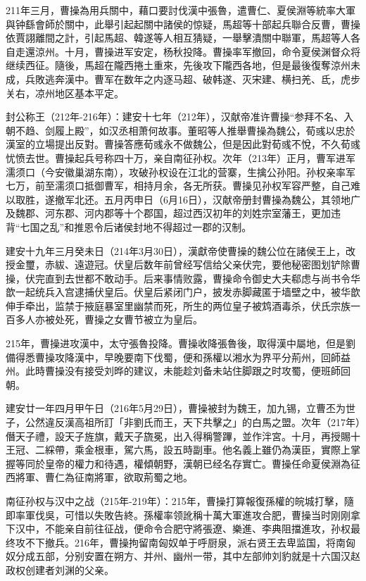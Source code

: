 211年三月，曹操為用兵關中，藉口要討伐漢中張魯，遣曹仁、夏侯淵等統率大軍與钟繇會師於關中，此舉引起起關中諸侯的惊疑，馬超等十部起兵聯合反曹，曹操依賈詡離間之計，引起馬超、韓遂等人相互猜疑，一舉擊潰關中聯軍，馬超等人各自走還涼州。十月，曹操进军安定，杨秋投降。曹操率军撤回，命令夏侯渊督众将继续西征。隨後，馬超在隴西捲土重來，先後攻下隴西各地，但是最後復奪涼州未成，兵敗逃奔漢中。曹军在数年之内逐马超、破韩遂、灭宋建、横扫羌、氐，虎步关右，凉州地区基本平定。

封公称王（212年-216年）：建安十七年（212年），汉献帝准许曹操“参拜不名、入朝不趋、剑履上殿”，如汉丞相萧何故事。董昭等人推舉曹操為魏公，荀彧以忠於漢室的立場提出反對。曹操答應荀彧永不做魏公，但是因此對荀彧不悅，不久荀彧忧愤去世。曹操起兵号称四十万，亲自南征孙权。次年（213年）正月，曹军进军濡须口（今安徽巢湖东南），攻破孙权设在江北的营寨，生擒公孙阳。孙权亲率军七万，前至濡须口抵御曹军，相持月余，各无所获。曹操见孙权军容严整，自己难以取胜，遂撤军北还。五月丙申日（6月16日），汉献帝册封曹操為魏公，其领地广及魏郡、河东郡、河内郡等十个郡国，超过西汉初年的刘姓宗室藩王，更加违背“七国之乱”和推恩令后诸侯封地不得超过一郡的汉制。

建安十九年三月癸未日（214年3月30日），漢獻帝使曹操的魏公位在諸侯王上，改授金璽，赤紱、遠遊冠。伏皇后数年前曾经写信给父亲伏完，要他秘密图划铲除曹操，伏完直到去世都不敢动手。后来事情败露，曹操命令御史大夫郗虑与尚书令华歆一起统兵入宫逮捕伏皇后。伏皇后紧闭门户，披发赤脚藏匿于墙壁之中，被华歆伸手牵出，监禁于掖庭暴室里幽禁而死，所生的两位皇子被鸩酒毒杀，伏氏宗族一百多人亦被处死，曹操之女曹节被立为皇后。

215年，曹操进攻漢中，太守張魯投降。曹操收降張魯後，取得漢中屬地，但是劉備得悉曹操攻降漢中，早晚要南下伐蜀，便和孫權以湘水为界平分荊州，回師益州。此時曹操没有接受刘晔的建议，未能趁刘备未站住脚跟之时攻蜀，便班師回朝。

建安廿一年四月甲午日（216年5月29日），曹操被封为魏王，加九锡，立曹丕为世子，公然違反漢高祖所訂「非劉氏而王，天下共擊之」的白馬之盟。次年（217年）僭天子禮，設天子旌旗，戴天子旒冕，出入得稱警蹕，並作泮宮。十月，再授賜十王冠、二綵帶，乘金根車，駕六馬，設五時副車。他名義上雖仍為漢臣，實際上掌握等同於皇帝的權力和待遇，權傾朝野，漢朝已经名存實亡。曹操任命夏侯淵為征西將軍、曹仁為征南將軍，欲取荊蜀之地。

南征孙权与汉中之战（215年-219年）：215年，曹操打算報復孫權的皖城打擊，隨即率軍伐吳，可惜以失敗告終。孫權率领訛稱十萬大軍進攻合肥，曹操当时刚刚拿下汉中，不能亲自前往征战，便命令合肥守將張遼、樂進、李典阻擋進攻，孙权最终攻不下撤兵。216年，曹操拘留南匈奴单于呼厨泉，派右贤王去卑监国，将南匈奴分成五部，分别安置在朔方、并州、幽州一带，其中左部帅刘豹就是十六国汉赵政权创建者刘渊的父亲。

